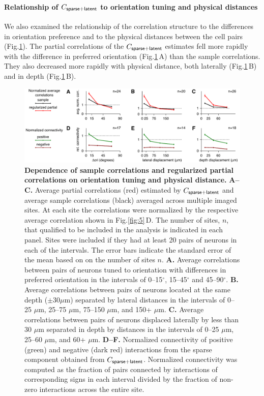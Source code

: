 \documentclass[10pt]{article}
\newcommand{\figref}[2]{Fig.\;\ref{fig:#1}\,#2}
\begin{document}
\paragraph{Relationship of $C_{\sf sparse+latent}$ to orientation tuning and physical distances}

We also examined the relationship of the correlation structure to the differences in orientation preference and to the physical distances between the cell pairs (Fig.\;\ref{fig:6}).  The partial correlations of the $C_{\sf sparse+latent}$ estimates fell more rapidly with the difference in preferred orientation (\figref{6}{A}) than the sample correlations. They also decreased more rapidly with physical distance, both laterally  (\figref{6}{B}) and in depth (\figref{6}{B}). 

\begin{figure}[!ht]
    \begin{center}
        \includegraphics{./figures/Figure06.pdf}
    \end{center}
    \caption{{\bf Dependence of sample correlations and regularized partial correlations on orientation tuning and physical distance.}
    {\bf A--C.} Average partial correlations (red) estimated by $C_{\sf sparse+latent}$ and average sample correlations (black) averaged across multiple imaged sites. At each site the correlations were normalized by the respective average correlation shown in \figref{5}{D}.  The number of sites, $n$, that qualified to be included in the analysis is indicated in each panel. Sites were included if they had at least 20 pairs of neurons in each of the intervals. The error bars indicate the standard error of the mean based on on the number of sites $n$.
    {\bf A.} Average correlations between pairs of neurons tuned to orientation with differences in preferred orientation in the intervals of 0--15$^\circ$, 15--45$^\circ$ and 45--90$^\circ$. 
    {\bf B.} Average correlations between pairs of neurons located at the same depth ($\pm$30$\mu$m) separated by lateral distances in the intervals of 0--25 $\mu$m, 25--75 $\mu$m, 75--150 $\mu$m, and 150+ $\mu$m.
    {\bf C.} Average correlations between pairs of neurons displaced laterally by less than 30 $\mu$m separated in depth by distances in the intervals of 0--25 $\mu$m, 25--60 $\mu$m, and 60+ $\mu$m.
    {\bf D--F.} Normalized connectivity of positive (green) and negative (dark red) interactions from the sparse component obtained from $C_{\sf sparse+latent}$. Normalized connectivity was computed as the fraction of pairs connected by interactions of corresponding signs in each interval divided by the fraction of non-zero interactions across the entire site. }
\label{fig:6}
\end{figure}
\end{document}
